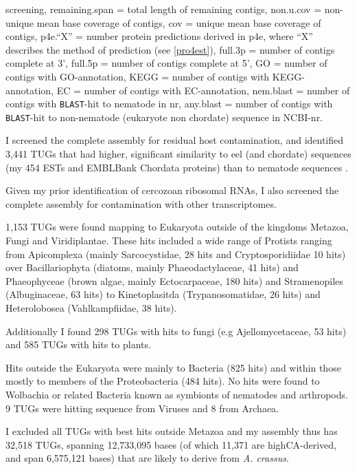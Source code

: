 \begin{table}[!h]
\begin{center}
{  screening, remaining.span = total length of remaining contigs,
  non.u.cov = non-unique mean base coverage of contigs, cov = unique
  mean base coverage of contigs, p4e.``X'' = number protein
  predictions derived in p4e, where ``X'' describes the method of
  prediction (see \ref{pro4est}), full.3p = number of contigs complete
  at 3', full.5p = number of contigs complete at 5', GO = number of
  contigs with GO-annotation, KEGG = number of contigs with
  KEGG-annotation, EC = number of contigs with EC-annotation,
  nem.blast = number of contigs with \texttt{BLAST}-hit to nematode in
  nr, any.blast = number of contigs with \texttt{BLAST}-hit to
  non-nematode (eukaryote non chordate) sequence in NCBI-nr.}
\label{ass-stat}
  \end{center}
\end{table}

\afterpage{\clearpage}

I screened the complete assembly for residual host contamination, and
identified 3,441 TUGs that had higher, significant similarity to eel
(and chordate) sequences (my 454 ESTs and EMBLBank Chordata proteins)
than to nematode sequences \cite{pmid21550347}.

Given my prior identification of cercozoan ribosomal RNAs, I also
screened the complete assembly for contamination with other
transcriptomes.

1,153 TUGs were found mapping to Eukaryota outside of the kingdoms
Metazoa, Fungi and Viridiplantae. These hits included a wide range of
Protists ranging from Apicomplexa (mainly Sarcocystidae, 28 hits and
Cryptosporidiidae 10 hits) over Bacillariophyta (diatoms, mainly
Phaeodactylaceae, 41 hits) and Phaeophyceae (brown algae, mainly
Ectocarpaceae, 180 hits) and Stramenopiles (Albuginaceae, 63 hits) to
Kinetoplasitda (Trypanosomatidae, 26 hits) and Heterolobosea
(Vahlkampfiidae, 38 hits).

Additionally I found 298 TUGs with hits to fungi (e.g
Ajellomycetaceae, 53 hits) and 585 TUGs with hits to plants.

Hits outside the Eukaryota were mainly to Bacteria (825 hits) and
within those mostly to members of the Proteobacteria (484 hits). No
hits were found to Wolbachia or related Bacteria known as symbionts of
nematodes and arthropods. 9 TUGs were hitting sequence from Viruses
and 8 from Archaea.

I excluded all TUGs with best hits outside Metazoa and my assembly
thus has 32,518 TUGs, spanning 12,733,095 bases (of which 11,371 are
highCA-derived, and span 6,575,121 bases) that are likely to derive
from \textit{A. crassus}.

